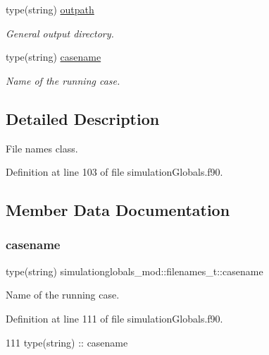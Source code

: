 \begin{DoxyCompactItemize}
type(string) \mbox{\hyperlink{structsimulationglobals__mod_1_1filenames__t_aa8af9fb10dcd5d2f5dfc0fe299a16755}{outpath}}
\begin{DoxyCompactList}\small\item\em General output directory. \end{DoxyCompactList}\item 
type(string) \mbox{\hyperlink{structsimulationglobals__mod_1_1filenames__t_a5a53822ea60d4941a19739cacb957469}{casename}}
\begin{DoxyCompactList}\small\item\em Name of the running case. \end{DoxyCompactList}\end{DoxyCompactItemize}


\subsection{Detailed Description}
File names class. 

Definition at line 103 of file simulation\+Globals.\+f90.



\subsection{Member Data Documentation}
\mbox{\label{structsimulationglobals__mod_1_1filenames__t_a5a53822ea60d4941a19739cacb957469}} 
\subsubsection{\texorpdfstring{casename}{casename}}
{\footnotesize\ttfamily type(string) simulationglobals\+\_\+mod\+::filenames\+\_\+t\+::casename\hspace{0.3cm}{\ttfamily [private]}}



Name of the running case. 



Definition at line 111 of file simulation\+Globals.\+f90.


\begin{DoxyCode}
111         \textcolor{keywordtype}{type}(string) :: casename
\end{DoxyCode}
\mbox{\label{structsimulationglobals__mod_1_1filenames__t_a28b7d9c5da2394c7a3ec6252bd95d9e4}} 
